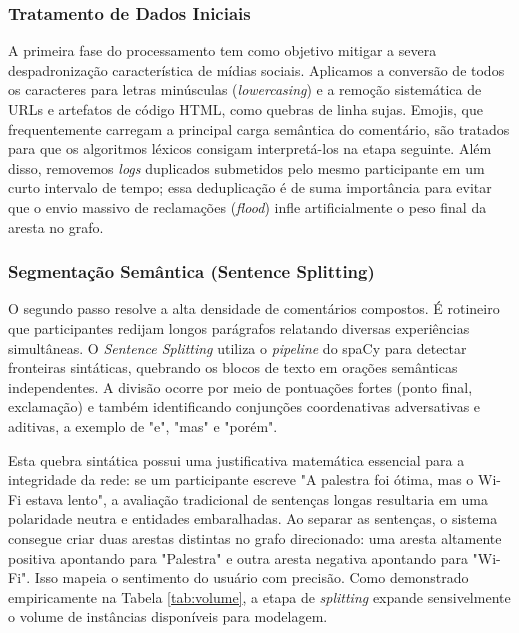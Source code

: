 \documentclass[sigconf]{webmedia}
\begin{document}
\subsubsection{Tratamento de Dados Iniciais}
A primeira fase do processamento tem como objetivo mitigar a severa despadronização característica de mídias sociais. Aplicamos a conversão de todos os caracteres para letras minúsculas (\textit{lowercasing}) e a remoção sistemática de URLs e artefatos de código HTML, como quebras de linha sujas. Emojis, que frequentemente carregam a principal carga semântica do comentário, são tratados para que os algoritmos léxicos consigam interpretá-los na etapa seguinte. Além disso, removemos \textit{logs} duplicados submetidos pelo mesmo participante em um curto intervalo de tempo; essa deduplicação é de suma importância para evitar que o envio massivo de reclamações (\textit{flood}) infle artificialmente o peso final da aresta no grafo.

\subsubsection{Segmentação Semântica (Sentence Splitting)}
O segundo passo resolve a alta densidade de comentários compostos. É rotineiro que participantes redijam longos parágrafos relatando diversas experiências simultâneas. O \textit{Sentence Splitting} utiliza o \textit{pipeline} do spaCy para detectar fronteiras sintáticas, quebrando os blocos de texto em orações semânticas independentes. A divisão ocorre por meio de pontuações fortes (ponto final, exclamação) e também identificando conjunções coordenativas adversativas e aditivas, a exemplo de "e", "mas" e "porém". 

Esta quebra sintática possui uma justificativa matemática essencial para a integridade da rede: se um participante escreve "A palestra foi ótima, mas o Wi-Fi estava lento", a avaliação tradicional de sentenças longas resultaria em uma polaridade neutra e entidades embaralhadas. Ao separar as sentenças, o sistema consegue criar duas arestas distintas no grafo direcionado: uma aresta altamente positiva apontando para "Palestra" e outra aresta negativa apontando para "Wi-Fi". Isso mapeia o sentimento do usuário com precisão. Como demonstrado empiricamente na Tabela \ref{tab:volume}, a etapa de \textit{splitting} expande sensivelmente o volume de instâncias disponíveis para modelagem.
\end{document}

